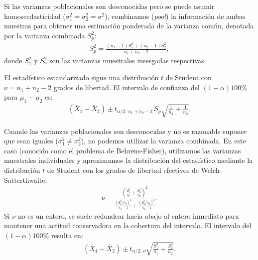 \begin{teorema}
	Si las varianzas poblacionales son desconocidas pero se puede asumir homoscedasticidad ($\sigma_1^2 = \sigma_2^2 = \sigma^2$), combinamos (\emph{pool}) la información de ambas muestras para obtener una estimación ponderada de la varianza común, denotada por la varianza combinada $S_p^2$:
	\begin{align}
		S_p^2 = \frac{(n_1 - 1)S_1^2 + (n_2 - 1)S_2^2}{n_1 + n_2 - 2},
		\label{eq:varianza_combinada}
	\end{align}
	donde $S_1^2$ y $S_2^2$ son las varianzas muestrales insesgadas respectivas.

	El estadístico estandarizado sigue una distribución $t$ de Student con $\nu = n_1 + n_2 - 2$ grados de libertad. El intervalo de confianza del $(1-\alpha)100\%$ para $\mu_1 - \mu_2$ es:
	\begin{align}
		(\bar{X}_1 - \bar{X}_2) \pm t_{\alpha/2, \, n_1+n_2-2} \, S_p \sqrt{\frac{1}{n_1} + \frac{1}{n_2}}.
	\end{align}
\end{teorema}

\begin{teorema}
	Cuando las varianzas poblacionales son desconocidas y no es razonable suponer que sean iguales ($\sigma_1^2 \neq \sigma_2^2$), no podemos utilizar la varianza combinada. En este caso (conocido como el problema de Behrens-Fisher), utilizamos las varianzas muestrales individuales y aproximamos la distribución del estadístico mediante la distribución $t$ de Student con los grados de libertad efectivos de Welch-Satterthwaite:
	\begin{align}
		\nu = \frac{\left( \frac{S_1^2}{n_1} + \frac{S_2^2}{n_2} \right)^2}{\frac{\left(S_1^2 / n_1\right)^2}{n_1 - 1} + \frac{\left(S_2^2 / n_2\right)^2}{n_2 - 1}}.
		\label{eq:df_welch}
	\end{align}
	Si $\nu$ no es un entero, se suele redondear hacia abajo al entero inmediato para mantener una actitud conservadora en la cobertura del intervalo. El intervalo del $(1-\alpha)100\%$ resulta en:
	\begin{align}
		(\bar{X}_1 - \bar{X}_2) \pm t_{\alpha/2, \, \nu} \sqrt{\frac{S_1^2}{n_1} + \frac{S_2^2}{n_2}}.
	\end{align}
\end{teorema}

